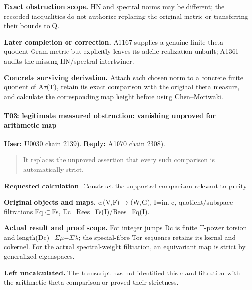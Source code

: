 \textbf{Exact obstruction scope.} HN and spectral norms may be
different; the recorded inequalities do not authorize replacing the
original metric or transferring their bounds to Q.

\textbf{Later completion or correction.} A1167 supplies a genuine finite
theta-quotient Gram metric but explicitly leaves its adelic realization
unbuilt; A1361 audits the missing HN/spectral intertwiner.

\textbf{Concrete surviving derivation.} Attach each chosen norm to a
concrete finite quotient of
A\allowbreak{}\ensuremath{τ}\allowbreak{}(T), retain its exact
comparison with the original theta measure, and calculate the
corresponding map height before using Chen--Moriwaki.

\paragraph{T03: legitimate measured obstruction; vanishing unproved for
arithmetic
map}\label{t03-legitimate-measured-obstruction-vanishing-unproved-for-arithmetic-map}

\textbf{User:} U0030
\protect{} chain 2139).
\textbf{Reply:} A1070
\protect{} chain 2308).

\begin{quote}
It replaces the unproved assertion that every such comparison is
automatically strict.
\end{quote}

\textbf{Requested calculation.} Construct the supported comparison
relevant to purity.

\textbf{Original objects and maps.}
c:(V,F)\allowbreak{}\ensuremath{→}\allowbreak{}(W,G), I=im c,
quotient/subspace filtrations
Fq\allowbreak{}\ensuremath{⊂}\allowbreak{}Fs,
Dc=Rees\_Fs(I)/Rees\_Fq(I).

\textbf{Actual result and proof scope.} For integer jumps Dc is finite
T-power torsion and
length(Dc)=\allowbreak{}\ensuremath{Σ}\allowbreak{}\allowbreak{}\ensuremath{μ}\allowbreak{}\allowbreak{}\ensuremath{−}\allowbreak{}\allowbreak{}\ensuremath{Σ}\allowbreak{}\allowbreak{}\ensuremath{λ}\allowbreak{};
the special-fibre Tor sequence retains its kernel and cokernel. For the
actual spectral-weight filtration, an equivariant map is strict by
generalized eigenspaces.

\textbf{Left uncalculated.} The transcript has not identified this c and
filtration with the arithmetic theta comparison or proved their
strictness.

